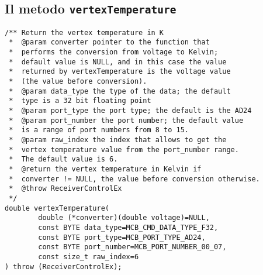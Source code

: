 \subsection{Il metodo \texttt{vertexTemperature}}
\lstset{language=C++}
\begin{lstlisting}[caption={Dichiarazione del metodo \texttt{vertexTemperature}},
label=lst:vertexTemperature,mathescape]
/** Return the vertex temperature in K
 *  @param converter pointer to the function that 
 *  performs the conversion from voltage to Kelvin; 
 *  default value is NULL, and in this case the value
 *  returned by vertexTemperature is the voltage value 
 *  (the value before conversion).
 *  @param data_type the type of the data; the default 
 *  type is a 32 bit floating point
 *  @param port_type the port type; the default is the AD24
 *  @param port_number the port number; the default value 
 *  is a range of port numbers from 8 to 15.
 *  @param raw_index the index that allows to get the 
 *  vertex temperature value from the port_number range. 
 *  The default value is 6.
 *  @return the vertex temperature in Kelvin if 
 *  converter != NULL, the value before conversion otherwise.
 *  @throw ReceiverControlEx
 */
double vertexTemperature(
        double (*converter)(double voltage)=NULL,
        const BYTE data_type=MCB_CMD_DATA_TYPE_F32,     
        const BYTE port_type=MCB_PORT_TYPE_AD24,       
        const BYTE port_number=MCB_PORT_NUMBER_00_07,  
        const size_t raw_index=6                      
) throw (ReceiverControlEx);
\end{lstlisting}
\lstset{numbers=none}


